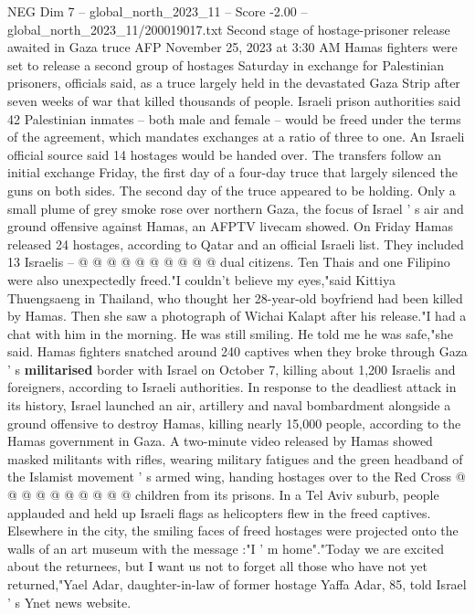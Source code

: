 \begin{textsample}{NEG Dim 7 – global\_north\_2023\_11 – Score -2.00 – global\_north\_2023\_11/200019017.txt}  \label{ex:f7_neg_320}
Second stage of hostage-prisoner release awaited in Gaza truce AFP November 25, 2023 at 3:30 AM Hamas fighters were set to release a second group of hostages Saturday in exchange for Palestinian prisoners, officials said, as a truce largely held in the devastated Gaza Strip after seven weeks of war that killed thousands of people.
Israeli prison authorities said 42 Palestinian inmates -- both male and female -- would be freed under the terms of the agreement, which mandates exchanges at a ratio of three to one.
An Israeli official source said 14 hostages would be handed over.
The transfers follow an initial exchange Friday, the first day of a four-day truce that largely silenced the guns on both sides.
The second day of the truce appeared to be holding.
Only a small plume of grey smoke rose over northern Gaza, the focus of Israel ' s air and ground offensive against Hamas, an AFPTV livecam showed.
On Friday Hamas released 24 hostages, according to Qatar and an official Israeli list.
They included 13 Israelis -- @ @ @ @ @ @ @ @ @ @ dual citizens.
Ten Thais and one Filipino were also unexpectedly freed."I couldn't believe my eyes,"said Kittiya Thuengsaeng in Thailand, who thought her 28-year-old boyfriend had been killed by Hamas.
Then she saw a photograph of Wichai Kalapt after his release."I had a chat with him in the morning.
He was still smiling.
He told me he was safe,"she said.
Hamas fighters snatched around 240 captives when they broke through Gaza ' s \textbf{militarised} border with Israel on October 7, killing about 1,200 Israelis and foreigners, according to Israeli authorities.
In response to the deadliest attack in its history, Israel launched an air, artillery and naval bombardment alongside a ground offensive to destroy Hamas, killing nearly 15,000 people, according to the Hamas government in Gaza.
A two-minute video released by Hamas showed masked militants with rifles, wearing military fatigues and the green headband of the Islamist movement ' s armed wing, handing hostages over to the Red Cross @ @ @ @ @ @ @ @ @ @ children from its prisons.
In a Tel Aviv suburb, people applauded and held up Israeli flags as helicopters flew in the freed captives.
Elsewhere in the city, the smiling faces of freed hostages were projected onto the walls of an art museum with the message :"I ' m home"."Today we are excited about the returnees, but I want us not to forget all those who have not yet returned,"Yael Adar, daughter-in-law of former hostage Yaffa Adar, 85, told Israel ' s Ynet news website.

\end{textsample}
